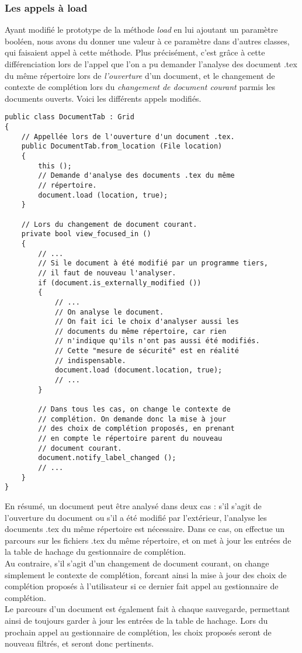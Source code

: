 \documentclass[a4paper,11pt]{report}
\begin{document}
\subsubsection{Les appels à load}
\label{sssec:les_appels_à_load}
Ayant modifié le prototype de la méthode \textit{load} en lui ajoutant un paramètre booléen, nous avons du donner une valeur à ce paramètre dans d'autres classes, qui faisaient appel à cette méthode.
Plus précisément, c'est grâce à cette différenciation lors de l'appel que l'on a pu demander l'analyse des document .tex du même répertoire lors de \textit{l'ouverture} d'un document, et le changement de contexte de complétion lors du \textit{changement de document courant} parmis les documents ouverts.
Voici les différents appels modifiés.

\begin{lstlisting}[frame=single]
public class DocumentTab : Grid
{
    // Appellée lors de l'ouverture d'un document .tex.
    public DocumentTab.from_location (File location)
    {
        this ();
        // Demande d'analyse des documents .tex du même
        // répertoire.
        document.load (location, true);
    }
    
    // Lors du changement de document courant.
    private bool view_focused_in ()
    {
        // ...
        // Si le document à été modifié par un programme tiers,
        // il faut de nouveau l'analyser.
        if (document.is_externally_modified ())
        {
            // ...
            // On analyse le document.
            // On fait ici le choix d'analyser aussi les
            // documents du même répertoire, car rien
            // n'indique qu'ils n'ont pas aussi été modifiés.
            // Cette "mesure de sécurité" est en réalité
            // indispensable.
            document.load (document.location, true);
            // ...
        }

        // Dans tous les cas, on change le contexte de
        // complétion. On demande donc la mise à jour
        // des choix de complétion proposés, en prenant
        // en compte le répertoire parent du nouveau
        // document courant.
        document.notify_label_changed ();
        // ...
    }
}
\end{lstlisting}

En résumé, un document peut être analysé dans deux cas : s'il s'agit de l'ouverture du document ou s'il a été modifié par l'extérieur, l'analyse les documents .tex du même répertoire est nécessaire.
Dans ce cas, on effectue un parcours sur les fichiers .tex du même répertoire, et on met à jour les entrées de la table de hachage du gestionnaire de complétion.
\\Au contraire, s'il s'agit d'un changement de document courant, on change simplement le contexte de complétion, forcant ainsi la mise à jour des choix de complétion proposés à l'utilisateur si ce dernier fait appel au gestionnaire de complétion.
\\Le parcours d'un document est également fait à chaque sauvegarde, permettant ainsi de toujours garder à jour les entrées de la table de hachage. Lors du prochain appel au gestionnaire de complétion, les choix proposés seront de nouveau filtrés, et seront donc pertinents.
\end{document}
